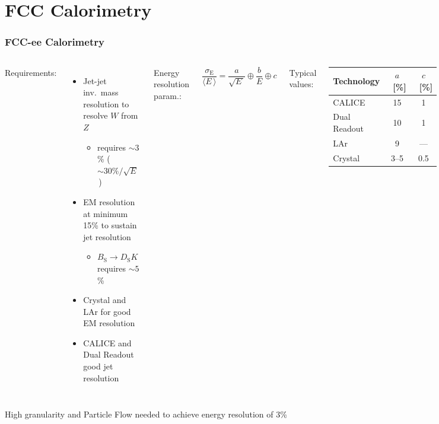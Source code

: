 \documentclass[aspectratio=169]{beamer}
\newcommand{\bluetext}[1]{%
  \textcolor{myBlue}{#1}
}
\newcommand{\redtext}[1]{%
  \textcolor{myRed}{#1}
}
\begin{document}
%
%
\section{FCC Calorimetry}

\begin{frame}
  \frametitle{FCC-ee Calorimetry}

  \vspace{2ex}
  \begin{columns}[c]
    \bluetext{Requirements:}
    \begin{itemize}
      \item Jet-jet inv.\ mass resolution to resolve $W$ from $Z$
            \begin{itemize}
              \item requires $\sim 3$\% ($\sim 30\% / \sqrt{E}$\,)
            \end{itemize}
      \item EM resolution at minimum 15\% to sustain jet resolution\\[-0.4ex]
            \begin{itemize}
              \item $B_\text{S} \rightarrow D_\text{S}K$ requires $\sim 5$\%
            \end{itemize}
      \item Crystal and LAr for good EM resolution
      \item CALICE and Dual Readout good jet resolution
    \end{itemize}

    \bluetext{Energy resolution param.:}
    \[ \frac{\sigma_\text{E}}{\langle E\,\rangle} = \frac{a}{\sqrt{E\,}} \oplus
                                                    \frac{b}{E} \oplus c \]

    \bluetext{Typical values:}
    \begin{center}
      \small
      \begin{tabular}{lcc}
        Technology   & $a$~[\%] & $c$~[\%] \\
        \midrule
        CALICE       & 15       & 1 \\
        Dual Readout & 10       & 1 \\
        LAr          & 9        & --- \\
        Crystal      & 3--5     & 0.5 \\
      \end{tabular}
    \end{center}
  \end{columns}

  \vspace{1ex}
  \redtext{High granularity and Particle Flow needed to achieve energy
           resolution of 3\%}
\end{frame}
\end{document}
